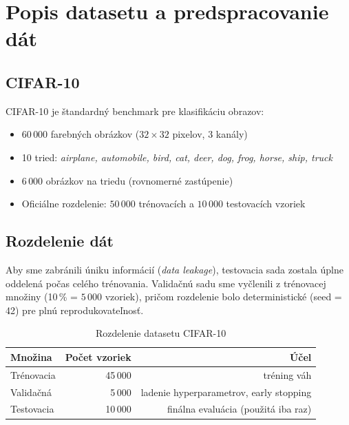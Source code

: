 \documentclass[12pt,a4paper]{article}
\begin{document}
\section{Popis datasetu a predspracovanie dát}

\subsection{CIFAR-10}

CIFAR-10 \cite{krizhevsky2009learning} je štandardný benchmark pre klasifikáciu obrazov:
\begin{itemize}
  \item $60\,000$ farebných obrázkov ($32 \times 32$ pixelov, 3 kanály)
  \item 10 tried: \textit{airplane, automobile, bird, cat, deer, dog, frog, horse, ship, truck}
  \item $6\,000$ obrázkov na triedu (rovnomerné zastúpenie)
  \item Oficiálne rozdelenie: $50\,000$ trénovacích a $10\,000$ testovacích vzoriek
\end{itemize}

\subsection{Rozdelenie dát}

Aby sme zabránili úniku informácií (\textit{data leakage}), testovacia sada zostala
úplne oddelená počas celého trénovania. Validačnú sadu sme vyčlenili
z trénovacej množiny (10\,\% = $5\,000$ vzoriek), pričom rozdelenie bolo deterministické
(seed = 42) pre plnú reprodukovateľnosť.

\begin{table}[H]
\centering
\caption{Rozdelenie datasetu CIFAR-10}
\begin{tabular}{lrr}
\toprule
\textbf{Množina} & \textbf{Počet vzoriek} & \textbf{Účel} \\
\midrule
Trénovacia  & 45\,000 & tréning váh \\
Validačná   &  5\,000 & ladenie hyperparametrov, early stopping \\
Testovacia  & 10\,000 & finálna evaluácia (použitá iba raz) \\
\bottomrule
\end{tabular}
\end{table}
\end{document}
